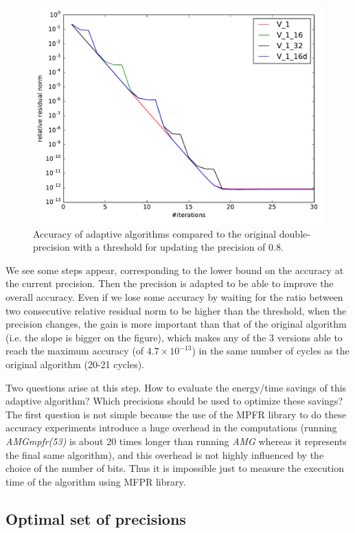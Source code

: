 \documentclass[10pt,conference]{IEEEtran}
\begin{document}
   \begin{figure} \centering
    \includegraphics[width=0.8\linewidth]{figs/prec_incr.pdf}
    \caption{Accuracy of adaptive algorithms compared to the original double-precision with a threshold for updating the precision of $0.8$.}
    \label{fig.prec_incr}
   \end{figure}
   
   We see some steps appear, corresponding to the lower bound on the accuracy at the current precision. Then the precision is adapted to be able to improve the overall accuracy. Even if we lose some accuracy by waiting for the ratio
   between two consecutive relative residual norm to be higher than the threshold, when the precision changes, the gain is more important than that of the original algorithm (i.e. the slope is bigger on the figure), which makes any of
   the 3 versions able to reach the maximum accuracy (of $4.7\times 10^{-13}$) in the same number of cycles as the original algorithm (20-21 cycles).
   
   Two questions arise at this step. How to evaluate the energy/time savings of this adaptive algorithm? Which precisions should be used to optimize these savings?\\
   The first question is not simple because the use of the MPFR library to do these accuracy experiments introduce a huge overhead in the computations (running \emph{AMGmpfr(53)} is about 20 times longer than running \emph{AMG} whereas it
   represents the final same algorithm), and this overhead is not highly influenced by the choice of the number of bits. Thus it is impossible just to measure the execution time of the algorithm using MFPR library.
   
   \subsection{Optimal set of precisions}
   
\end{document}
